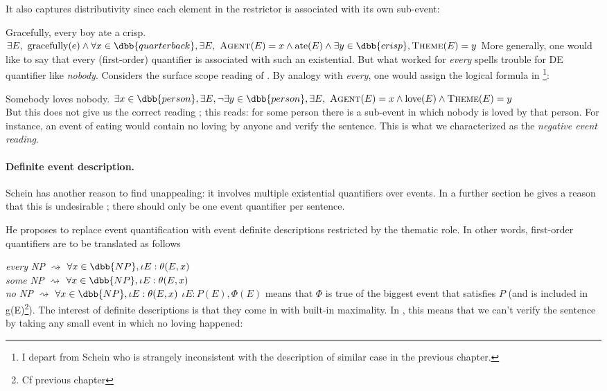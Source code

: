 It also captures distributivity since each element in the restrictor is associated with its own sub-event:

\pex
\a
Gracefully, every boy ate a crisp.
\a
$\exists E,\ \text{gracefully}(e) \wedge \forall x\in\dbb{quarterback}, \exists E,\ \textsc{Agent}(E) = x \wedge \text{ate}(E) \wedge \exists y\in\dbb{crisp}, \textsc{Theme}(E) = y$ 
\xe
%
More generally, one would like to say that every (first-order) quantifier is associated with such an existential. But what worked for \emph{every} spells trouble for DE quantifier like \emph{nobody}. Considers the surface scope reading of \cnextxa. By analogy with \emph{every}, one would assign \cnextxa the logical formula in \cnextxb\footnote{
I depart from Schein who is strangely inconsistent with the description of similar case in the previous chapter.
}:

\pex
\a \label{sono}
Somebody loves nobody.
\a 
$\exists x\in\dbb{person},\exists E, \neg\exists y\in \dbb{person}, \exists E,\  \textsc{Agent}(E) = x \wedge \text{love}(E) \wedge \textsc{Theme}(E) = y$\\
\xe
%
But this does not give us the correct reading ; this reads: for some person there is a sub-event in which nobody is loved by that person. For instance, an event of eating would contain no loving by anyone and verify the sentence. This is what we characterized as the \emph{negative event reading}.

\paragraph{Definite event description.}
Schein has another reason to find \clastxa unappealing: it involves multiple existential quantifiers over events. In a further section he gives a reason that this is undesirable ; there should only be one event quantifier per sentence. 

He proposes to replace event quantification with event definite descriptions restricted by the thematic role. In other words, first-order quantifiers are to be translated as follows

\pex
\a
\emph{every NP} $\rightsquigarrow$ $\forall x\in \dbb{NP}, \iota E : \theta(E, x)$\\
\emph{some NP} $\rightsquigarrow$ $\forall x\in \dbb{NP}, \iota E : \theta(E, x)$\\
\emph{no NP} $\rightsquigarrow$ $\forall x\in \dbb{NP}, \iota E : \theta(E, x)$
\a 
$\iota E : P(E), \Phi(E)$ means that $\Phi$ is true of the biggest event that satisfies $P$ (and is included in g(E)\footnote{Cf previous chapter}).
\xe
%
The interest of definite descriptions is that they come in with built-in maximality. In \cnextx, this means that we can't verify the sentence by taking any small event in which no loving happened:


